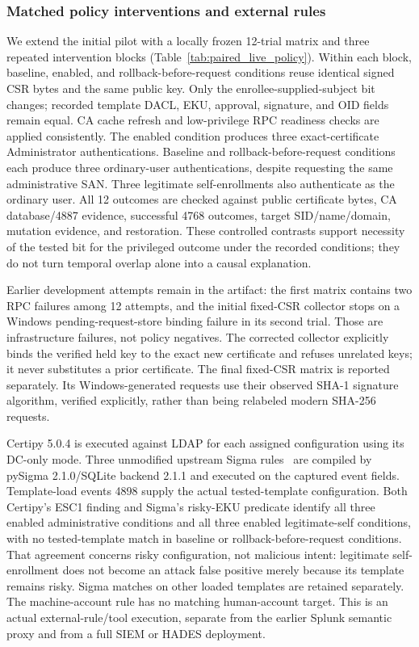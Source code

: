 \subsubsection{Matched policy interventions and external rules}
We extend the initial pilot with a locally frozen 12-trial matrix and three repeated intervention blocks (Table~\ref{tab:paired_live_policy}). Within each block, baseline, enabled, and rollback-before-request conditions reuse identical signed CSR bytes and the same public key. Only the enrollee-supplied-subject bit changes; recorded template DACL, EKU, approval, signature, and OID fields remain equal. CA cache refresh and low-privilege RPC readiness checks are applied consistently. The enabled condition produces three exact-certificate Administrator authentications. Baseline and rollback-before-request conditions each produce three ordinary-user authentications, despite requesting the same administrative SAN. Three legitimate self-enrollments also authenticate as the ordinary user. All 12 outcomes are checked against public certificate bytes, CA database/4887 evidence, successful 4768 outcomes, target SID/name/domain, mutation evidence, and restoration. These controlled contrasts support necessity of the tested bit for the privileged outcome under the recorded conditions; they do not turn temporal overlap alone into a causal explanation.

Earlier development attempts remain in the artifact: the first matrix contains two RPC failures among 12 attempts, and the initial fixed-CSR collector stops on a Windows pending-request-store binding failure in its second trial. Those are infrastructure failures, not policy negatives. The corrected collector explicitly binds the verified held key to the exact new certificate and refuses unrelated keys; it never substitutes a prior certificate. The final fixed-CSR matrix is reported separately. Its Windows-generated requests use their observed SHA-1 signature algorithm, verified explicitly, rather than being relabeled modern SHA-256 requests.

Certipy 5.0.4 is executed against LDAP for each assigned configuration using its DC-only mode. Three unmodified upstream Sigma rules~\cite{sigma2026rules} are compiled by pySigma 2.1.0/SQLite backend 2.1.1 and executed on the captured event fields. Template-load events 4898 supply the actual tested-template configuration. Both Certipy's ESC1 finding and Sigma's risky-EKU predicate identify all three enabled administrative conditions and all three enabled legitimate-self conditions, with no tested-template match in baseline or rollback-before-request conditions. That agreement concerns risky configuration, not malicious intent: legitimate self-enrollment does not become an attack false positive merely because its template remains risky. Sigma matches on other loaded templates are retained separately. The machine-account rule has no matching human-account target. This is an actual external-rule/tool execution, separate from the earlier Splunk semantic proxy and from a full SIEM or HADES deployment.

